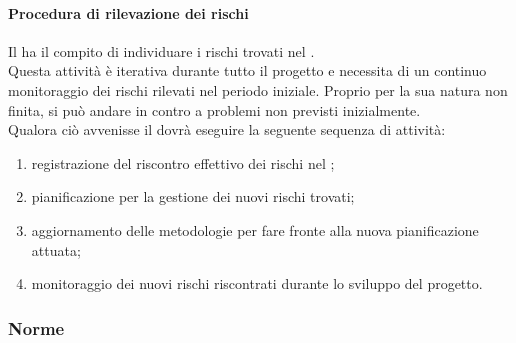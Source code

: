 			\paragraph{Procedura di rilevazione dei rischi}
			Il \roleProjectManager{} ha il compito di individuare i rischi trovati nel \docNameVersionPdP. \\
			Questa attività è iterativa durante tutto il progetto e necessita di un continuo monitoraggio dei rischi rilevati nel periodo iniziale. Proprio per la sua natura non finita, si può andare in contro a problemi non previsti inizialmente. \\
			Qualora ciò avvenisse il \roleProjectManager{} dovrà eseguire la seguente sequenza di attività:
				\begin{enumerate}
					\item registrazione del riscontro effettivo dei rischi nel \docNameVersionPdP;
					\item pianificazione per la gestione dei nuovi rischi trovati;
					\item aggiornamento delle metodologie per fare fronte alla nuova pianificazione attuata;
					\item monitoraggio dei nuovi rischi riscontrati durante lo sviluppo del progetto.
				\end{enumerate}
				
		\subsubsection{Norme}
